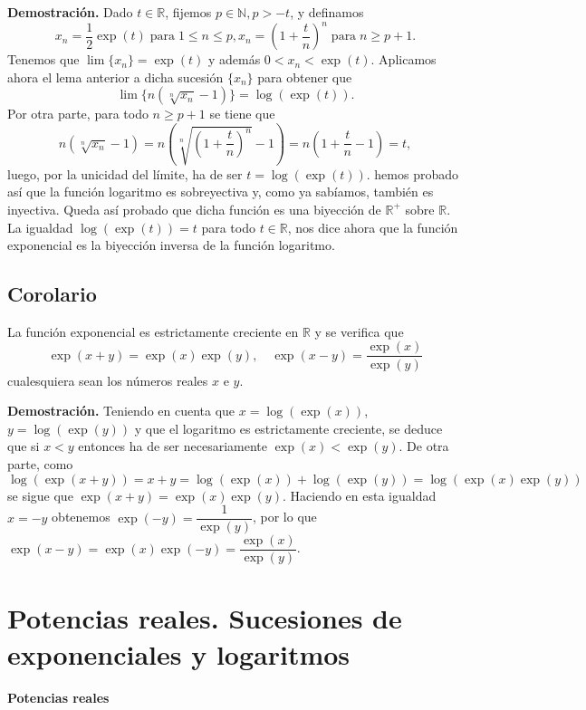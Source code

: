 \documentclass[10pt,a4paper]{article}
\begin{document}
	\textbf{Demostración.} Dado $t \in \mathbb{R}$, fijemos $p \in \mathbb{N}, p > -t$, y definamos $$ x_n = \dfrac{1}{2}\exp(t) \; \text{para} \; 1 \leq n \leq p, x_n = \left(1 + \dfrac{t}{n}\right) ^n \; \text{para} \; n \geq p + 1.$$
	Tenemos que $\lim\{x_n\} = \exp(t)$ y además $ 0 < x_n < \exp(t)$. Aplicamos ahora el lema anterior a dicha sucesión $\{x_n\}$ para obtener que $$\lim\{n(\sqrt[n]{x_n} - 1)\} = \log(\exp(t)).$$ Por otra parte, para todo $n \geq p + 1$ se tiene que $$ n (\sqrt[n]{x_n} - 1) = n \left( \sqrt[n]{\left(1 + \dfrac{t}{n}\right) ^n} - 1\right) = n \left(1 + \dfrac{t}{n} - 1\right) = t,$$ luego, por la unicidad del límite, ha de ser $t = \log(\exp(t))$. hemos probado así que la función logaritmo es sobreyectiva y, como ya sabíamos, también es inyectiva. Queda así probado que dicha función es una biyección de $\mathbb{R} ^+ $ sobre $\mathbb{R}$. La igualdad $\log(\exp(t)) = t$ para todo $t \in \mathbb{R}$, nos dice ahora que la función exponencial es la biyección inversa de la función logaritmo.
	
	\subsection{Corolario}
	
	La función exponencial es estrictamente creciente en $\mathbb{R}$ y se verifica que $$\exp(x+y) = \exp(x) \exp(y), \quad \exp(x-y) = \dfrac{\exp(x)}{\exp(y)}$$ cualesquiera sean los números reales $x$ e $y$.
	
	\textbf{Demostración. }Teniendo en cuenta que $x = \log(\exp(x))$, $y = \log(\exp(y))$ y que el logaritmo es estrictamente creciente, se deduce que si $x < y$ entonces ha de ser necesariamente $\exp(x) < \exp(y)$. De otra parte, como $$ \log(\exp(x+y)) = x + y = \log(\exp(x)) + \log(\exp(y)) = \log(\exp(x)\exp(y))$$ se sigue que $\exp(x+y) = \exp(x)\exp(y)$. Haciendo en esta igualdad $x = -y$ obtenemos $\exp(-y) = \dfrac{1}{\exp(y)}$, por lo que $\exp(x-y) = \exp(x)\exp(-y) = \dfrac{\exp(x)}{\exp(y)}$.
	
	\newpage
	
	\section{Potencias reales. Sucesiones de exponenciales y logaritmos}
	
	\textbf{\Large{Potencias reales}}
	
\end{document}
